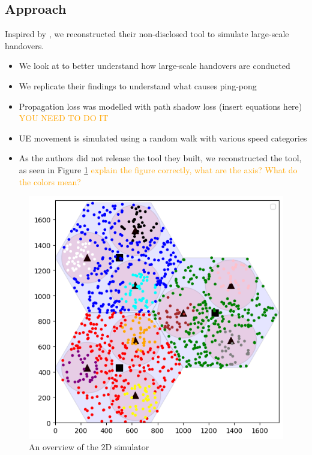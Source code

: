\subsection{Approach}
Inspired by \citep{hatipoglu_handover-based_2020}, we reconstructed their non-disclosed tool to simulate large-scale handovers.
\begin{itemize}
    \item We look at  to better understand how large-scale handovers are conducted
    \item We replicate their findings to understand what causes ping-pong
    \item Propagation loss was modelled with path shadow loss (insert equations here) \textcolor{orange}{YOU NEED TO DO IT}
    \item UE movement is simulated using a random walk with various speed categories
    \item As the authors did not release the tool they built, we reconstructed the tool, as seen in Figure \ref{fig:methods:grouped-uesim} \textcolor{orange}{explain the figure correctly, what are the axis? What do the colors mean?}
\end{itemize}
\begin{figure}
    \centering
    \includegraphics[width=0.75\linewidth]{src//img/grouped_uesim.png}
    \caption{An overview of the 2D simulator}
    \label{fig:methods:grouped-uesim}
\end{figure}
